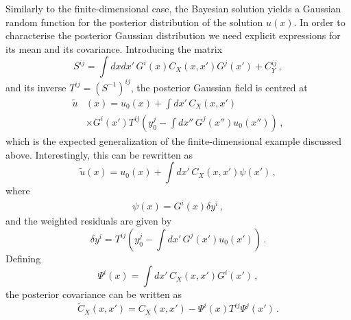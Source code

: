 Similarly to the finite-dimensional case, the Bayesian solution yields a
Gaussian random function for the posterior distribution of the solution $u(x)$.
In order to characterise the posterior Gaussian distribution we need explicit
expressions for its mean and its covariance. Introducing the matrix
\begin{equation}
  \label{eq:Smatrix}
  S^{ij} =
  \int dx dx'\, G^i(x) C_{X}(x,x') G^j(x') + C_{Y}^{ij}\, ,
\end{equation}
and its inverse $T^{ij}=\left(S^{-1}\right)^{ij}$, the posterior Gaussian field
is centred at
\begin{align}
  \label{eq:PostMeanFunc}
  \tilde{u}&(x) = u_0(x) + \int dx'\, C_{X}(x,x') \nonumber \\ 
  &\times G^i(x') T^{ij} \left(
    y_0^j - \int dx''\, G^j(x'') u_0(x'') 
  \right)\, ,
\end{align}
which is the expected generalization of the finite-dimensional example discussed
above. Interestingly, this can be rewritten as
\begin{equation}
  \label{eq:TowardsBackus}
  \tilde{u}(x) = u_0(x) + 
  \int dx'\, C_{X}(x,x') \psi(x')\, ,
\end{equation}
where 
\begin{eqnarray}
  \label{eq:PsiDef}
  \psi(x) = G^i(x) \delta y^i\, ,
\end{eqnarray}
and the weighted residuals are given by
\begin{equation}
  \label{eq:DeltaYDef}
  \delta y^i = T^{ij} \left(
  y_0^j - \int dx'\, G^j(x') u_0(x')
  \right)\, .
\end{equation}
Defining 
\begin{equation}
  \label{eq:CapitalPsi}
  \Psi^i(x) = \int dx'\, C_{X}(x,x') G^i(x')\, ,
\end{equation}
the posterior covariance can be written as
\begin{equation}
  \label{eq:PostCovFunc}
  \tilde{C}_{X}(x,x') = 
  C_{X}(x,x') - \Psi^i(x) T^{ij} \Psi^j(x')\, .
\end{equation}

